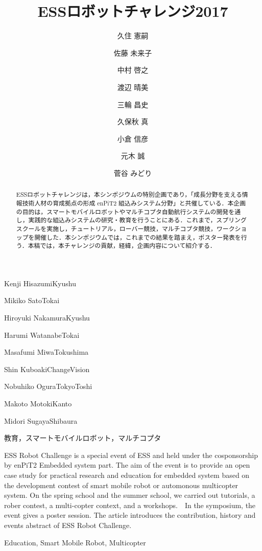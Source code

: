 \documentclass[submit]{ipsj}
\begin{document}
\title{ESSロボットチャレンジ2017}



\author{久住 憲嗣}{Kenji Hisazumi}{Kyushu}
\author{佐藤 未来子}{Mikiko Sato}{Tokai}
\author{中村 啓之}{Hiroyuki Nakamura}{Kyushu}
\author{渡辺 晴美}{Harumi Watanabe}{Tokai}
\author{三輪 昌史}{Masafumi Miwa}{Tokushima}
\author{久保秋 真}{Shin Kuboaki}{ChangeVision}
\author{小倉 信彦}{Nobuhiko Ogura}{TokyoToshi}
\author{元木 誠}{Makoto Motoki}{Kanto}
\author{菅谷 みどり}{Midori Sugaya}{Shibaura}


\begin{abstract}
ESSロボットチャレンジは，本シンポジウムの特別企画であり，「成長分野を支える情報技術人材の育成拠点の形成
enPiT2 組込みシステム分野」と共催している．本企画の目的は，スマートモバイルロボットやマルチコプタ自動航行システムの開発を通し，実践的な組込みシステムの研究・教育を行うことにある．これまで，スプリングスクールを実施し，チュートリアル，ローバー競技，マルチコプタ競技，ワークショップを開催した．本シンポジウムでは，これまでの結果を踏まえ，ポスター発表を行う．本稿では，本チャレンジの貢献，経緯，企画内容について紹介する．
\end{abstract}

\begin{jkeyword}
教育，スマートモバイルロボット，マルチコプタ
\end{jkeyword}

\begin{eabstract}
ESS Robot Challenge is a special event of ESS and held under the cosponsorship by enPiT2 Embedded system part. The aim of the event is to provide an open case study for practical research and education for embedded system based on the development contest of smart mobile robot or automonous multicopter system. On the spring school and the summer school, we carried out tutorials, a rober contest, a multi-copter context, and a workshops.　In the symposium, the event gives a poster session. The article introduces the contribution, history and events abstract of ESS Robot Challenge.
\end{eabstract}

\begin{ekeyword}
Education, Smart Mobile Robot, Multicopter
\end{ekeyword}
\end{document}

